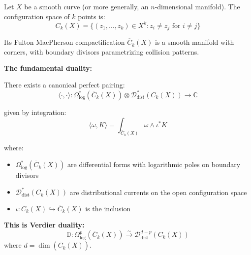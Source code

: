 \begin{setup}\label{setup:config-verdier}
Let $X$ be a smooth curve (or more generally, an $n$-dimensional manifold). The configuration space of $k$ points is:
$$C_k(X) = \{(z_1, \ldots, z_k) \in X^k : z_i \neq z_j \text{ for } i \neq j\}$$

Its Fulton-MacPherson compactification $\overline{C}_k(X)$ is a smooth manifold with corners, with boundary divisors parametrizing collision patterns.

\textbf{The fundamental duality:}
\end{setup}

\begin{theorem}\label{thm:verdier-config}
There exists a canonical perfect pairing:
$$\langle \cdot, \cdot \rangle: \Omega^*_{\log}(\overline{C}_k(X)) \otimes \mathcal{D}^*_{\text{dist}}(C_k(X)) \to \mathbb{C}$$

given by integration:
$$\langle \omega, K \rangle = \int_{\overline{C}_k(X)} \omega \wedge \iota^* K$$

where:
\begin{itemize}
\item $\Omega^*_{\log}(\overline{C}_k(X))$ are differential forms with logarithmic poles on boundary divisors
\item $\mathcal{D}^*_{\text{dist}}(C_k(X))$ are distributional currents on the open configuration space
\item $\iota: C_k(X) \hookrightarrow \overline{C}_k(X)$ is the inclusion
\end{itemize}

\textbf{This is Verdier duality:}
$$\mathbb{D}: \Omega^p_{\log}(\overline{C}_k(X)) \xrightarrow{\sim} \mathcal{D}^{d-p}_{\text{dist}}(C_k(X))$$
where $d = \dim(\overline{C}_k(X))$.
\end{theorem}

